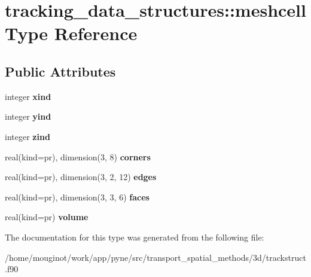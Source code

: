 \hypertarget{structtracking__data__structures_1_1meshcell}{}\section{tracking\+\_\+data\+\_\+structures\+:\+:meshcell Type Reference}
\label{structtracking__data__structures_1_1meshcell}
\subsection*{Public Attributes}
\begin{DoxyCompactItemize}
\item 
\mbox{\label{structtracking__data__structures_1_1meshcell_afd4a41c0924cdfa672043dff98383247}} 
integer {\bfseries xind}
\item 
\mbox{\label{structtracking__data__structures_1_1meshcell_aaf221593bf60310472dfdcc78d6c2e79}} 
integer {\bfseries yind}
\item 
\mbox{\label{structtracking__data__structures_1_1meshcell_ae19a4af32e3f12bfa8042da05505aa6e}} 
integer {\bfseries zind}
\item 
\mbox{\label{structtracking__data__structures_1_1meshcell_a13fcf4021ce5a5d1579ffbff38aaf33d}} 
real(kind=pr), dimension(3, 8) {\bfseries corners}
\item 
\mbox{\label{structtracking__data__structures_1_1meshcell_a4edd8593d1bb0badbc5d723780d2c6c5}} 
real(kind=pr), dimension(3, 2, 12) {\bfseries edges}
\item 
\mbox{\label{structtracking__data__structures_1_1meshcell_a8b0a596007ab35b13961d9037d7b6e44}} 
real(kind=pr), dimension(3, 3, 6) {\bfseries faces}
\item 
\mbox{\label{structtracking__data__structures_1_1meshcell_a1a08090e934eae80b9b27f55c4ccaa00}} 
real(kind=pr) {\bfseries volume}
\end{DoxyCompactItemize}


The documentation for this type was generated from the following file\+:\begin{DoxyCompactItemize}
\item 
/home/mouginot/work/app/pyne/src/transport\+\_\+spatial\+\_\+methods/3d/trackstruct.\+f90\end{DoxyCompactItemize}

